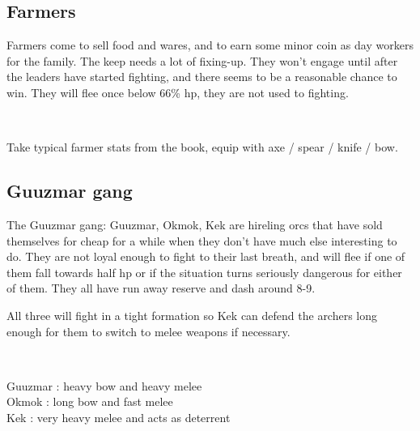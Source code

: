 

\goodbreak
\begin{samepage}
\subsection*{Farmers}
Farmers come to sell food and wares, and to earn some minor coin as day workers for the family. The keep needs a lot of fixing-up. They won't engage until after the leaders have started fighting, and there seems to be a reasonable chance to win. They will flee once below 66\% hp, they are not used to fighting.

\

\noindent
Take typical farmer stats from the book, equip with axe / spear / knife / bow.
\end{samepage}






\goodbreak
\subsection*{Guuzmar gang}
\label{sec:guuzmarstats}
The Guuzmar gang: Guuzmar, Okmok, Kek are hireling orcs that have sold themselves for cheap for a while when they don't have much else interesting to do. They are not loyal enough to fight to their last breath, and will flee if one of them fall towards half hp or if the situation turns seriously dangerous for either of them. They all have run away reserve and dash around 8-9.

All three will fight in a tight formation so Kek can defend the archers long enough for them to switch to melee weapons if necessary.

\

\noindent    %
Guuzmar : heavy bow and heavy melee\\
Okmok :  long bow and fast melee\\
Kek : very heavy melee and acts as deterrent

\


